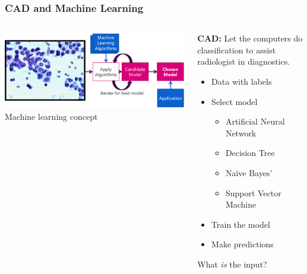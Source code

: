 \documentclass[aspectratio=1610]{beamer}
\begin{document}
\begin{frame}
  \frametitle{\hfill CAD and Machine Learning}
  \begin{columns}[T]
    \begin{column}{.5\textwidth}
      \begin{block}{}
        \includegraphics[width=\textwidth]{images/MLprocess2.PNG}\\
        Machine learning concept
      \end{block}
    \end{column}
    \begin{column}{.5\textwidth}
      \begin{block}{}
        \textbf{CAD:} Let the computers do classification to assist radiologist in diagnostics.\pause
        \begin{itemize}
          \item Data with labels\pause
          \item Select model
          \begin{itemize}
            \item Artificial Neural Network
            \item Decision Tree
            \item Na\"ive Bayes'
            \item Support Vector Machine\pause
          \end{itemize}
          \item Train the model\pause
          \item Make predictions\pause
        \end{itemize}
        \vspace{0.02\textheight}
        What \textit{is} the input?
      \end{block}
    \end{column}
  \end{columns}
\end{frame}
\end{document}
